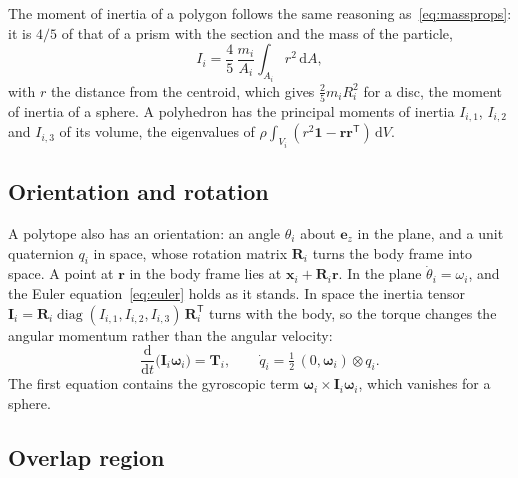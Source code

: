 The moment of inertia of a polygon follows the same reasoning as~\eqref{eq:massprops}: it is $4/5$ of that of a prism with the section and the mass of the particle,
\begin{equation}
  I_{i} = \frac{4}{5}\,\frac{m_{i}}{A_{i}}\int_{A_{i}} r^{2}\,\mathrm{d}A ,
  \label{eq:polygon-inertia}
\end{equation}
with $r$ the distance from the centroid, which gives $\tfrac{2}{5}m_{i}R_{i}^{2}$ for a disc, the moment of inertia of a sphere.
A polyhedron has the principal moments of inertia $I_{i,1}$, $I_{i,2}$ and $I_{i,3}$ of its volume, the eigenvalues of $\rho\int_{V_{i}}(r^{2}\mathbf{1}-\mathbf{r}\mathbf{r}^{\mathsf{T}})\,\mathrm{d}V$.

\subsection{Orientation and rotation}

A polytope also has an orientation: an angle $\theta_{i}$ about $\mathbf{e}_{z}$ in the plane, and a unit quaternion $q_{i}$ in space, whose rotation matrix $\mathbf{R}_{i}$ turns the body frame into space.
A point at $\mathbf{r}$ in the body frame lies at $\mathbf{x}_{i}+\mathbf{R}_{i}\mathbf{r}$.
In the plane $\dot{\theta}_{i}=\omega_{i}$, and the Euler equation~\eqref{eq:euler} holds as it stands.
In space the inertia tensor $\mathbf{I}_{i}=\mathbf{R}_{i}\operatorname{diag}(I_{i,1},I_{i,2},I_{i,3})\,\mathbf{R}_{i}^{\mathsf{T}}$ turns with the body, so the torque changes the angular momentum rather than the angular velocity:
\begin{equation}
  \frac{\mathrm{d}}{\mathrm{d}t}\bigl(\mathbf{I}_{i}\boldsymbol{\omega}_{i}\bigr) = \mathbf{T}_{i},
  \qquad
  \dot{q}_{i} = \tfrac{1}{2}\,(0,\boldsymbol{\omega}_{i})\otimes q_{i}.
  \label{eq:euler-polyhedron}
\end{equation}
The first equation contains the gyroscopic term $\boldsymbol{\omega}_{i}\times\mathbf{I}_{i}\boldsymbol{\omega}_{i}$, which vanishes for a sphere.

\subsection{Overlap region}

